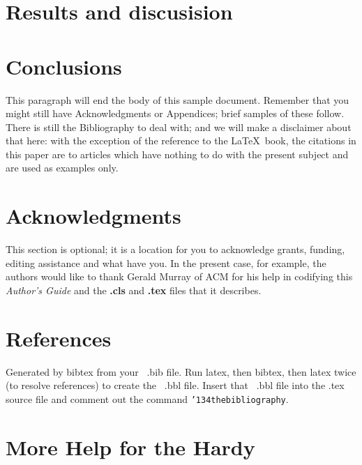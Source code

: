 \documentclass{sig-alternate-05-2015}
\begin{document}
\section{Results and discusision}

\section{Conclusions}
This paragraph will end the body of this sample document.
Remember that you might still have Acknowledgments or
Appendices; brief samples of these
follow.  There is still the Bibliography to deal with; and
we will make a disclaimer about that here: with the exception
of the reference to the \LaTeX\ book, the citations in
this paper are to articles which have nothing to
do with the present subject and are used as
examples only.

\section{Acknowledgments}
This section is optional; it is a location for you
to acknowledge grants, funding, editing assistance and
what have you.  In the present case, for example, the
authors would like to thank Gerald Murray of ACM for
his help in codifying this \textit{Author's Guide}
and the \textbf{.cls} and \textbf{.tex} files that it describes.


\section{References}
Generated by bibtex from your ~.bib file.  Run latex,
then bibtex, then latex twice (to resolve references)
to create the ~.bbl file.  Insert that ~.bbl file into
the .tex source file and comment out
the command \texttt{{\char'134}thebibliography}.
\section{More Help for the Hardy}
\end{document}

